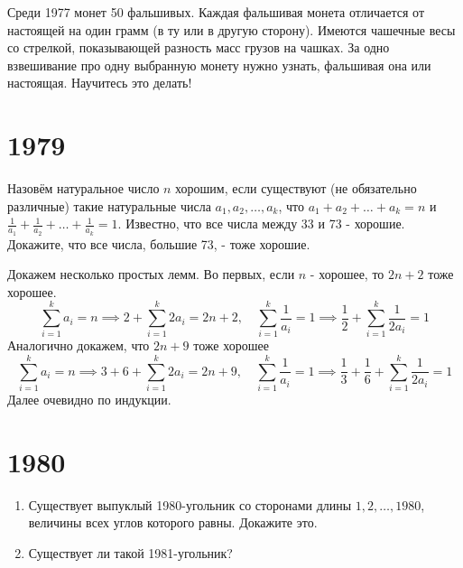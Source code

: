 \documentclass[11pt, a4paper]{common/document_template}
\begin{document}
\begin{exercise}[466]
Среди 1977 монет 50 фальшивых. Каждая фальшивая монета отличается от настоящей на один грамм (в ту или в другую сторону). Имеются чашечные весы со стрелкой, показывающей разность масс грузов на чашках. За одно взвешивание про одну выбранную монету нужно узнать, фальшивая она или настоящая. Научитесь это делать!
\end{exercise}

\chapter{1979}

\begin{exercise}[554]
Назовём натуральное число $n$ хорошим, если существуют (не обязательно различные) такие натуральные числа $a_{1}, a_{2}, \dots, a_{k}$, что $a_{1} + a_{2} + \dots + a_{k} = n$ и $\frac{1}{a_{1}} + \frac{1}{a_{2}} + \dots + \frac{1}{a_{k}} = 1$. Известно, что все числа между 33 и 73 - хорошие. Докажите, что все числа, большие 73, - тоже хорошие.
\end{exercise}

\begin{Solution}
Докажем несколько простых лемм. Во первых, если $n$ - хорошее, то $2n + 2$ тоже хорошее. 
$$
\sum_{i = 1}^{k} a_{i} = n \implies 2 + \sum_{i = 1}^{k} 2a_{i} = 2n + 2, \quad \sum_{i = 1}^{k} \frac{1}{a_{i}} = 1 \implies \frac{1}{2} + \sum_{i = 1}^{k} \frac{1}{2a_{i}} = 1
$$
Аналогично докажем, что $2n+9$ тоже хорошее
$$
\sum_{i = 1}^{k} a_{i} = n \implies 3 + 6 + \sum_{i = 1}^{k} 2a_{i} = 2n + 9, \quad \sum_{i = 1}^{k} \frac{1}{a_{i}} = 1 \implies \frac{1}{3} + \frac{1}{6} + \sum_{i = 1}^{k} \frac{1}{2a_{i}} = 1
$$
Далее очевидно по индукции.
\end{Solution}

\chapter{1980}

\begin{exercise}[644]
\begin{enumerate}
\item Существует выпуклый 1980-угольник со сторонами длины $1, 2, \dots, 1980$,
величины всех углов которого равны. Докажите это.
\item Существует ли такой 1981-угольник?
\end{enumerate}
\end{exercise}
\end{document}
